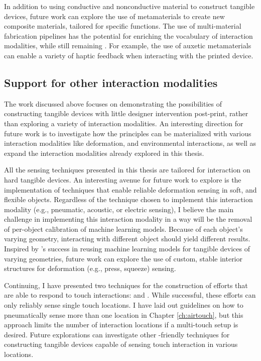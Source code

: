       In addition to using conductive and nonconductive material to construct
      tangible devices, future work can explore the use of metamaterials to
      create new composite materials, tailored for specific functions.  The use
      of multi-material fabrication pipelines has the potential for enriching
      the vocabulary of interaction modalities, while still remaining \pap.  For
      example, the use of auxetic metamaterials can enable a variety of haptic
      feedback when interacting with the printed device.

    \subsection{Support for other interaction modalities}
      The work discussed above focuses on demonstrating the possibilities of
      constructing tangible devices with little designer intervention
      post-print, rather than exploring a variety of interaction modalities. An
      interesting direction for future work is to investigate how the \papf
      principles can be materialized with various interaction modalities like
      deformation, and environmental interactions, as well as expand the
      interaction modalities already explored in this thesis.

      All the sensing techniques presented in this thesis are tailored for
      interaction on hard tangible devices. An interesting avenue for future
      work to explore is the implementation of \pap techniques that enable
      reliable deformation sensing in soft, and flexible objects. Regardless of
      the technique chosen to implement this interaction modality (e.g.,
      pneumatic, acoustic, or electric sensing), I believe the main challenge in
      implementing this interaction modality in a \pap way will be the removal
      of per-object calibration of machine learning models. Because of each
      object's varying geometry, interacting with different object should yield
      different results. Inspired by \at's success in reusing machine learning
      models for tangible devices of varying geometries, future work can explore
      the use of custom, stable interior structures for deformation (e.g.,
      press, squeeze) sensing.

      Continuing, I have presented two techniques for the construction of
      efforts that are able to respond to touch interactions: \at and \al. While
      successful, these efforts can only reliably sense single touch locations.
      I have laid out guidelines on how to pneumatically sense more than one
      location in Chapter \ref{ch:airtouch}, but this approach limits the number
      of interaction locations if a multi-touch setup is desired. Future
      explorations can investigate other \pap-friendly techniques for
      constructing tangible devices capable of sensing touch interaction in
      various locations.

